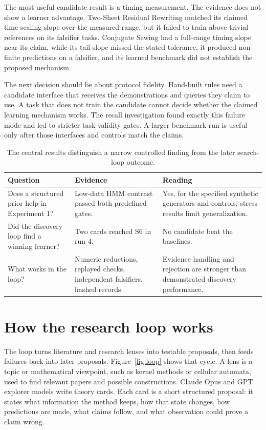 The most useful candidate result is a timing measurement. The evidence does not show a learner advantage. Two-Sheet Residual Rewriting matched its claimed time-scaling slope over the measured range, but it failed to train above trivial references on its falsifier tasks. Conjugate Sewing had a full-range timing slope near its claim, while its tail slope missed the stated tolerance, it produced non-finite predictions on a falsifier, and its learned benchmark did not establish the proposed mechanism.

The next decision should be about protocol fidelity. Hand-built rules need a candidate interface that receives the demonstrations and queries they claim to use. A task that does not train the candidate cannot decide whether the claimed learning mechanism works. The recall investigation found exactly this failure mode and led to stricter task-validity gates. A larger benchmark run is useful only after those interfaces and controls match the claims.

\begin{table}[ht]
\centering\small
\caption{The central results distinguish a narrow controlled finding from the later search-loop outcome.}
\begin{tabular}{p{3.1cm}p{5.1cm}p{5.4cm}}
\toprule
Question & Evidence & Reading \\
\midrule
Does a structured prior help in Experiment 1? & Low-data HMM contrast passed both predefined gates. & Yes, for the specified synthetic generators and controls; stress results limit generalization. \\
Did the discovery loop find a winning learner? & Two cards reached S6 in run 4. & No candidate beat the baselines. \\
What works in the loop? & Numeric reductions, replayed checks, independent falsifiers, hashed records. & Evidence handling and rejection are stronger than demonstrated discovery performance. \\
\bottomrule
\end{tabular}
\end{table}

\section{How the research loop works}

The loop turns literature and research lenses into testable proposals, then feeds failures back into later proposals. Figure~\ref{fig:loop} shows that cycle. A lens is a topic or mathematical viewpoint, such as kernel methods or cellular automata, used to find relevant papers and possible constructions. Claude Opus and GPT explorer models write theory cards. Each card is a short structured proposal: it states what information the method keeps, how that state changes, how predictions are made, what claims follow, and what observation could prove a claim wrong.


